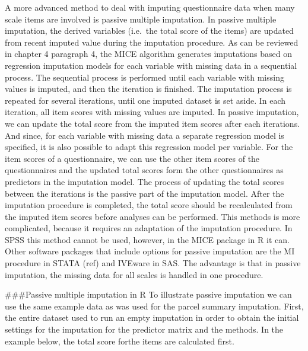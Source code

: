 \documentclass[
]{book}
\begin{document}
A more advanced method to deal with imputing questionnaire data when many scale items are involved is passive multiple imputation. In passive multiple imputation, the derived variables (i.e.~the total score of the items) are updated from recent imputed value during the imputation procedure. As can be reviewed in chapter 4 paragraph 4, the MICE algorithm generates imputations based on regression imputation models for each variable with missing data in a sequential process. The sequential process is performed until each variable with missing values is imputed, and then the iteration is finished. The imputation process is repeated for several iterations, until one imputed dataset is set aside. In each iteration, all item scores with missing values are imputed. In passive imputation, we can update the total score from the imputed item scores after each iterations. And since, for each variable with missing data a separate regression model is specified, it is also possible to adapt this regression model per variable. For the item scores of a questionnaire, we can use the other item scores of the questionnaires and the updated total scores form the other questionnaires as predictors in the imputation model. The process of updating the total scores between the iterations is the passive part of the imputation model. After the imputation procedure is completed, the total score should be recalculated from the imputed item scores before analyses can be performed.
This methods is more complicated, because it requires an adaptation of the imputation procedure. In SPSS this method cannot be used, however, in the MICE package in R it can. Other software packages that include options for passive imputation are the MI procedure in STATA (ref) and IVEware in SAS. The advantage is that in passive imputation, the missing data for all scales is handled in one procedure.

\#\#\#Passive multiple imputation in R
To illustrate passive imputation we can use the same example data as was used for the parcel summary imputation. First, the entire dataset used to run an empty imputation in order to obtain the initial settings for the imputation for the predictor matrix and the methods. In the example below, the total score forthe items are calculated first.
\end{document}

